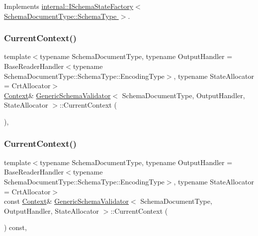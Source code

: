 Implements \hyperlink{classinternal_1_1ISchemaStateFactory_aa9420905f406101f930bca3c9ca3a865}{internal\+::\+I\+Schema\+State\+Factory$<$ Schema\+Document\+Type\+::\+Schema\+Type $>$}.

\mbox{\label{classGenericSchemaValidator_a057dffa977f78cb7447a0850500cb2e0}} 
\subsubsection{\texorpdfstring{Current\+Context()}{CurrentContext()}\hspace{0.1cm}{\footnotesize\ttfamily [1/2]}}
{\footnotesize\ttfamily template$<$typename Schema\+Document\+Type, typename Output\+Handler = Base\+Reader\+Handler$<$typename Schema\+Document\+Type\+::\+Schema\+Type\+::\+Encoding\+Type$>$, typename State\+Allocator = Crt\+Allocator$>$ \\
\hyperlink{classGenericSchemaValidator_ac6403619afb8aa8729e1e15d8c34d350}{Context}\& \hyperlink{classGenericSchemaValidator}{Generic\+Schema\+Validator}$<$ Schema\+Document\+Type, Output\+Handler, State\+Allocator $>$\+::Current\+Context (\begin{DoxyParamCaption}{ }\end{DoxyParamCaption})\hspace{0.3cm}{\ttfamily [inline]}, {\ttfamily [private]}}

\mbox{\label{classGenericSchemaValidator_a9008095198e2f892e91f018db2fc0536}} 
\subsubsection{\texorpdfstring{Current\+Context()}{CurrentContext()}\hspace{0.1cm}{\footnotesize\ttfamily [2/2]}}
{\footnotesize\ttfamily template$<$typename Schema\+Document\+Type, typename Output\+Handler = Base\+Reader\+Handler$<$typename Schema\+Document\+Type\+::\+Schema\+Type\+::\+Encoding\+Type$>$, typename State\+Allocator = Crt\+Allocator$>$ \\
const \hyperlink{classGenericSchemaValidator_ac6403619afb8aa8729e1e15d8c34d350}{Context}\& \hyperlink{classGenericSchemaValidator}{Generic\+Schema\+Validator}$<$ Schema\+Document\+Type, Output\+Handler, State\+Allocator $>$\+::Current\+Context (\begin{DoxyParamCaption}{ }\end{DoxyParamCaption}) const\hspace{0.3cm}{\ttfamily [inline]}, {\ttfamily [private]}}

